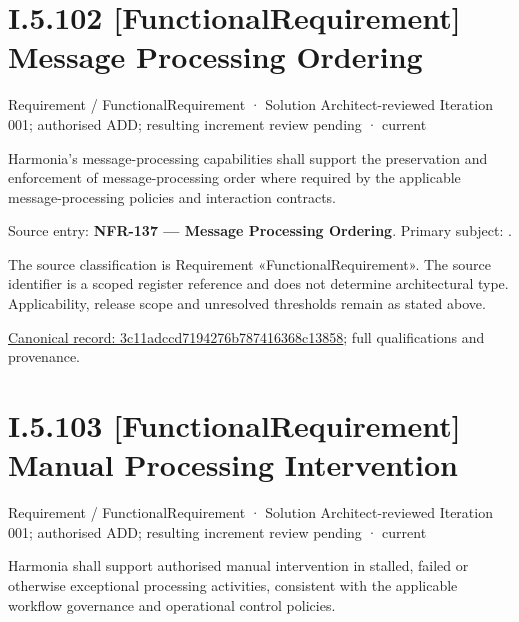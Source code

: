 \section*{I.5.102 [FunctionalRequirement] Message Processing Ordering}
\label{navigation:I.5.102}

\label{element:3c11adccd7194276b787416368c13858}
{\small Requirement / FunctionalRequirement · Solution Architect-reviewed Iteration 001; authorised ADD; resulting increment review pending · current}\par

Harmonia's message-processing capabilities shall support the preservation and enforcement of message-processing order where required by the applicable message-processing policies and interaction contracts.



Source entry: \textbf{NFR-137 — Message Processing Ordering}. Primary subject: \texttt{}.



The source classification is Requirement «FunctionalRequirement». The source identifier is a scoped register reference and does not determine architectural type. Applicability, release scope and unresolved thresholds remain as stated above.


{\footnotesize \href{../../../../../../../continuum/motivation/requirement/functional-requirement/3c11adccd7194276b787416368c13858.md}{Canonical record: 3c11adccd7194276b787416368c13858}; full qualifications and provenance.}\par
\section*{I.5.103 [FunctionalRequirement] Manual Processing Intervention}
\label{navigation:I.5.103}

\label{element:911511665a8a4135b7f2a37f5f79ad36}
{\small Requirement / FunctionalRequirement · Solution Architect-reviewed Iteration 001; authorised ADD; resulting increment review pending · current}\par

Harmonia shall support authorised manual intervention in stalled, failed or otherwise exceptional processing activities, consistent with the applicable workflow governance and operational control policies.




